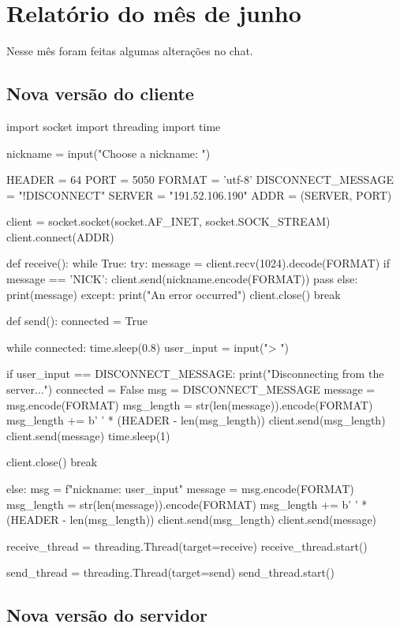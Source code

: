 	\section{Relatório do mês de junho}
	
	Nesse mês foram feitas algumas alterações no chat.
	
	\subsection*{Nova versão do cliente}
	
	\begin{pycode}
		import socket
		import threading
		import time
		
		nickname = input("Choose a nickname: ")
		
		HEADER = 64
		PORT = 5050
		FORMAT = 'utf-8'
		DISCONNECT_MESSAGE = "!DISCONNECT"
		SERVER = "191.52.106.190"
		ADDR = (SERVER, PORT)
		
		client = socket.socket(socket.AF_INET, socket.SOCK_STREAM)
		client.connect(ADDR)
		
		def receive():
		while True:
		try:
		message = client.recv(1024).decode(FORMAT)
		if message == 'NICK':
		client.send(nickname.encode(FORMAT))
		pass
		else:
		print(message)
		except:
		print("An error occurred")
		client.close()
		break
		
		def send():
		connected = True
		
		while connected:
		time.sleep(0.8)
		user_input = input("> ")
		
		if user_input == DISCONNECT_MESSAGE:
		print("Disconnecting from the server...")
		connected = False
		msg = DISCONNECT_MESSAGE
		message = msg.encode(FORMAT)
		msg_length = str(len(message)).encode(FORMAT)
		msg_length += b' ' * (HEADER - len(msg_length))
		client.send(msg_length)
		client.send(message)
		time.sleep(1)
		
		client.close()
		break
		
		else:
		msg = f"{nickname}: {user_input}"
		message = msg.encode(FORMAT)
		msg_length = str(len(message)).encode(FORMAT)
		msg_length += b' ' * (HEADER - len(msg_length))
		client.send(msg_length)
		client.send(message)
		
		receive_thread = threading.Thread(target=receive)
		receive_thread.start()
		
		send_thread = threading.Thread(target=send)
		send_thread.start()
	\end{pycode}
	
	\subsection*{Nova versão do servidor}
	
